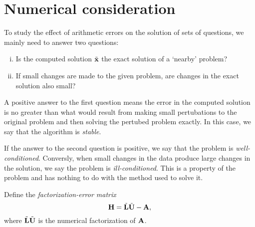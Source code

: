 \section{Numerical consideration}
\begin{defn}
    \label{defn::stabledefn}
    To study the effect of arithmetic errors on the solution 
    of sets of questions, we mainly need to answer two 
    questions:
    \begin{enumerate}[(i)]
        \item Is the computed solution $\tilde{{\mathbf{x}}}$ the exact 
        solution of a `nearby' problem?
        \item If small changes are made to the given problem, 
        are changes in the exact solution also small?
    \end{enumerate}
    A positive answer to the first question means the error in 
    the computed solution is no greater than what would result 
    from making small pertubations to the original problem and 
    then solving the pertubed problem exactly. In this case, we 
    say that the algorithm is \textit{stable}.

    If the answer to the second question is positive, we say 
    that the problem is \textit{well-conditioned}. Conversly, 
    when small changes in the data produce large changes in the 
    solution, we say the problem is \textit{ill-conditioned}. 
    This is a property of the problem and has nothing to do 
    with the method used to solve it.
\end{defn}

\begin{defn}
    Define the \textit{factorization-error matrix}
    $$
        \mathbf{H}=\tilde{{\mathbf{L}}}\tilde{{\mathbf{U}}}-{\mathbf{A}},
    $$ 
    where $\tilde{{\mathbf{L}}}\tilde{{\mathbf{U}}}$ is the numerical 
    factorization of ${\mathbf{A}}$.
\end{defn}


